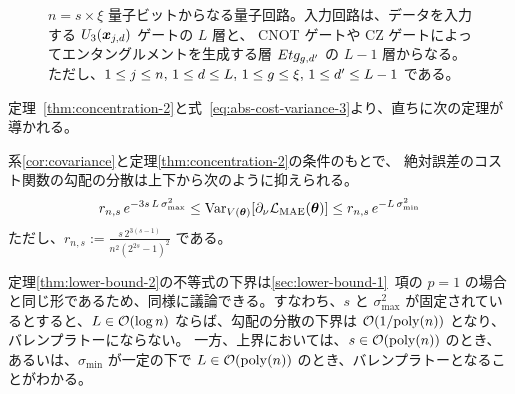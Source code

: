 \begin{figure}
    \caption{$n = s\times\xi$ 量子ビットからなる量子回路。入力回路は、データを入力する $U_3(\boldsymbol{x}_{j,d})$ ゲートの $L$ 層と、 CNOT ゲートや CZ ゲートによってエンタングルメントを生成する層 $Etg_{g,d^\prime}$ の $L-1$ 層からなる。ただし、$1\leq j\leq n,\, 1\leq d\leq L,\, 1\leq g\leq \xi,\, 1\leq d^\prime\leq L-1$ である。}
    \label{fig:circuit-concentration-2}
\end{figure}


定理~\ref{thm:concentration-2}と式~\eqref{eq:abs-cost-variance-3}より、直ちに次の定理が導かれる。
\begin{screen}
    \begin{theorem}\label{thm:lower-bound-2}
        系\ref{cor:covariance}と定理\ref{thm:concentration-2}の条件のもとで、
        絶対誤差のコスト関数の勾配の分散は上下から次のように抑えられる。
        \begin{align}
            r_{n,s}\, e^{-3s\,L\,\sigma_{\max}^2}
            \leq \operatorname{Var}_{V(\boldsymbol{\theta})}[\partial_\nu\mathcal{L}_{\mathrm{MAE}}(\boldsymbol{\theta})]
            \leq r_{n,s}\, e^{-L\,\sigma_{\min}^2}
        \end{align}
        ただし、$r_{n,s} := \frac{s\,2^{3(s-1)}}{n^2(2^{2s}-1)^2}$ である。
    \end{theorem}
\end{screen}


定理\ref{thm:lower-bound-2}の不等式の下界は\ref{sec:lower-bound-1}~項の $p = 1$ の場合と同じ形であるため、同様に議論できる。すなわち、$s$ と $\sigma_{\max}^2$ が固定されているとすると、$L \in \order{\log{n}}$ ならば、勾配の分散の下界は $\order{1/\poly(n)}$ となり、バレンプラトーにならない。
一方、上界においては、$s \in \order{\poly(n)}$ のとき、あるいは、$\sigma_{\min}$ が一定の下で $L \in \order{\poly(n)}$ のとき、バレンプラトーとなることがわかる。




